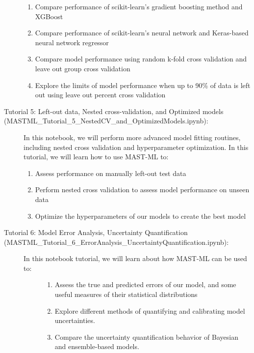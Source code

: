 \documentclass[letterpaper,10pt,english]{sphinxmanual}
\begin{document}
\begin{description}
\begin{enumerate}
\item {} 
Compare performance of scikit-learn’s gradient boosting method and XGBoost

\item {} 
Compare performance of scikit-learn’s neural network and Keras-based neural network regressor

\item {} 
Compare model performance using random k-fold cross validation and leave out group cross validation

\item {} 
Explore the limits of model performance when up to 90\% of data is left out using leave out percent cross validation

\end{enumerate}

\item[{Tutorial 5: Left-out data, Nested cross-validation, and Optimized models (MASTML\_Tutorial\_5\_NestedCV\_and\_OptimizedModels.ipynb):}] \leavevmode
In this notebook, we will perform more advanced model fitting routines, including nested cross validation and
hyperparameter optimization. In this tutorial, we will learn how to use MAST-ML to:
\begin{enumerate}
%
\item {} 
Assess performance on manually left-out test data

\item {} 
Perform nested cross validation to assess model performance on unseen data

\item {} 
Optimize the hyperparameters of our models to create the best model

\end{enumerate}

\item[{Tutorial 6: Model Error Analysis, Uncertainty Quantification (MASTML\_Tutorial\_6\_ErrorAnalysis\_UncertaintyQuantification.ipynb):}] \leavevmode\begin{description}
\item[{In this notebook tutorial, we will learn about how MAST-ML can be used to:}] \leavevmode\begin{enumerate}
%
\item {} 
Assess the true and predicted errors of our model, and some useful measures of their statistical distributions

\item {} 
Explore different methods of quantifying and calibrating model uncertainties.

\item {} 
Compare the uncertainty quantification behavior of Bayesian and ensemble-based models.

\end{enumerate}

\end{description}

\end{description}
\end{document}
